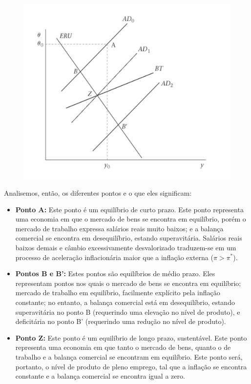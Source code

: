 \documentclass[a4paper,12pt]{article}[abntex2]
\begin{document}
\begin{figure}[H]
    \centering
    \includegraphics[width=0.7\linewidth]{Imagens/a26i9.png}
\end{figure}

Analisemos, então, os diferentes pontos e o que eles significam:

\begin{itemize}
    \item \textbf{Ponto A:} Este ponto é um equilíbrio de curto prazo. Este ponto representa uma economia em que o mercado de bens se encontra em equilíbrio, porém o mercado de trabalho expressa salários reais muito baixos; e a balança comercial se encontra em desequilíbrio, estando superavitária. Salários reais baixos demais e câmbio excessivamente desvalorizado traduzem-se em um processo de aceleração inflacionária maior que a inflação externa (\( \pi > \pi^* \)).

    \item \textbf{Pontos B e B’:} Estes pontos são equilíbrios de médio prazo. Eles representam pontos nos quais o mercado de bens se encontra em equilíbrio; mercado de trabalho em equilíbrio, facilmente explícito pela inflação constante; no entanto, a balança comercial está em desequilíbrio, estando superavitária no ponto B (requerindo uma elevação no nível de produto), e deficitária no ponto B’ (requerindo uma redução no nível de produto).

    \item \textbf{Ponto Z:} Este ponto é um equilíbrio de longo prazo, sustentável. Este ponto representa uma economia em que tanto o mercado de bens, quanto o de trabalho e a balança comercial se encontram em equilíbrio. Este ponto será, portanto, o nível de produto de pleno emprego, tal que a inflação se encontra constante e a balança comercial se encontra igual a zero.
\end{itemize}
\end{document}
